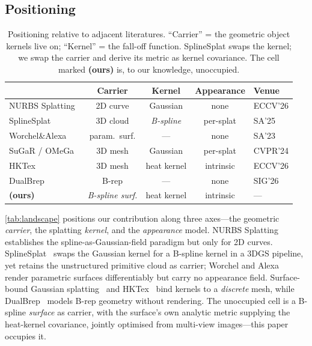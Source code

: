 \subsection{Positioning}\label{sec:rw:gap}

\begin{table}[t]
  \caption{Positioning relative to adjacent literatures. ``Carrier'' = the
  geometric object kernels live on; ``Kernel'' = the fall-off function.
  SplineSplat swaps the kernel; we swap the carrier and derive its metric as
  kernel covariance. The cell marked \textbf{(ours)} is, to our knowledge,
  unoccupied.}
  \label{tab:landscape}
  \small
  \begin{tabular}{lcccl}
    \toprule
     & Carrier & Kernel & Appearance & Venue \\
    \midrule
    NURBS Splatting~\cite{nurbssplatting} & 2D curve & Gaussian & none & ECCV'26 \\
    SplineSplat~\cite{splinesplat} & 3D cloud & \emph{B-spline} & per-splat & SA'25 \\
    Worchel\&Alexa~\cite{worchelalexa2023} & param.~surf. & --- & none & SA'23 \\
    SuGaR / OMeGa~\cite{sugar,omega} & 3D mesh & Gaussian & per-splat & CVPR'24 \\
    HKTex~\cite{hktex} & 3D mesh & heat kernel & intrinsic & ECCV'26 \\
    DualBrep~\cite{dualbrep} & B-rep & --- & none & SIG'26 \\
    \textbf{(ours)} & \emph{B-spline surf.} & heat kernel & intrinsic & --- \\
    \bottomrule
  \end{tabular}
\end{table}

\autoref{tab:landscape} positions our contribution along three axes---the
geometric \emph{carrier}, the splatting \emph{kernel}, and the
\emph{appearance} model. NURBS Splatting~\cite{nurbssplatting} establishes the
spline-as-Gaussian-field paradigm but only for 2D curves.
SplineSplat~\cite{splinesplat} swaps the Gaussian kernel for a B-spline kernel
in a 3DGS pipeline, yet retains the unstructured primitive cloud as carrier;
Worchel and Alexa~\cite{worchelalexa2023} render parametric surfaces
differentiably but carry no appearance field. Surface-bound Gaussian
splatting~\cite{sugar,omega,gaustar,meshgs} and HKTex~\cite{hktex} bind
kernels to a \emph{discrete} mesh, while DualBrep~\cite{dualbrep} models
B-rep geometry without rendering. The unoccupied cell is a B-spline
\emph{surface} as carrier, with the surface's own analytic metric supplying
the heat-kernel covariance, jointly optimised from multi-view images---this
paper occupies it.
